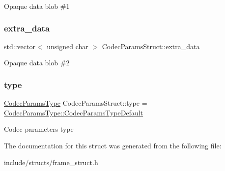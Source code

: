 Opaque data blob \#1 \mbox{\label{structmoetsi_1_1ssp_1_1CodecParamsStruct_a7a3e3671d31c439210ce7902f9392de5}} 
\subsubsection{\texorpdfstring{extra\+\_\+data}{extra\_data}}
{\footnotesize\ttfamily std\+::vector$<$ unsigned char $>$ Codec\+Params\+Struct\+::extra\+\_\+data}

Opaque data blob \#2 \mbox{\label{structmoetsi_1_1ssp_1_1CodecParamsStruct_ac865cc09b5aa332a3dc00d67a91e022b}} 
\subsubsection{\texorpdfstring{type}{type}}
{\footnotesize\ttfamily \hyperlink{namespacemoetsi_1_1ssp_a6d638ba0bd38e9daded08f633d893563}{Codec\+Params\+Type} Codec\+Params\+Struct\+::type = \hyperlink{namespacemoetsi_1_1ssp_a6d638ba0bd38e9daded08f633d893563a1ffd3a6c06641b95d3e5142403ed0730}{Codec\+Params\+Type\+::\+Codec\+Params\+Type\+Default}}

Codec parameters type 

The documentation for this struct was generated from the following file\+:\begin{DoxyCompactItemize}
\item 
include/structs/frame\+\_\+struct.\+h\end{DoxyCompactItemize}
